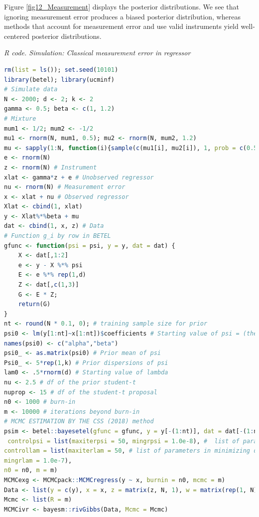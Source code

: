 Figure \ref{fig12_Measurement} displays the posterior distributions. We see that ignoring measurement error produces a biased posterior distribution, whereas methods that account for measurement error and use valid instruments yield well-centered posterior distributions.

\begin{tcolorbox}[enhanced,width=4.67in,center upper,
	fontupper=\large\bfseries,drop shadow southwest,sharp corners]
	\textit{R code. Simulation: Classical measurement error in regressor}
	\begin{VF}
		\begin{lstlisting}[language=R]	
rm(list = ls()); set.seed(10101)
library(betel); library(ucminf)
# Simulate data
N <- 2000; d <- 2; k <- 2
gamma <- 0.5; beta <- c(1, 1.2)
# Mixture
mum1 <- 1/2; mum2 <- -1/2
mu1 <- rnorm(N, mum1, 0.5); mu2 <- rnorm(N, mum2, 1.2)
mu <- sapply(1:N, function(i){sample(c(mu1[i], mu2[i]), 1, prob = c(0.5, 0.5))})
e <- rnorm(N)
z <- rnorm(N) # Instrument
xlat <- gamma*z + e # Unobserved regressor
nu <- rnorm(N) # Measurement error
x <- xlat + nu # Observed regressor
Xlat <- cbind(1, xlat)
y <- Xlat%*%beta + mu
dat <- cbind(1, x, z) # Data
# Function g_i by row in BETEL
gfunc <- function(psi = psi, y = y, dat = dat) {
	X <- dat[,1:2]
	e <- y - X %*% psi
	E <- e %*% rep(1,d)
	Z <- dat[,c(1,3)]
	G <- E * Z;
	return(G)
}
nt <- round(N * 0.1, 0); # training sample size for prior
psi0 <- lm(y[1:nt]~x[1:nt])$coefficients # Starting value of psi = (theta, v), v is the slack parameter in CSS (2018)
names(psi0) <- c("alpha","beta")
psi0_ <- as.matrix(psi0) # Prior mean of psi 
Psi0_ <- 5*rep(1,k) # Prior dispersions of psi
lam0 <- .5*rnorm(d) # Starting value of lambda
nu <- 2.5 # df of the prior student-t
nuprop <- 15 # df of the student-t proposal
n0 <- 1000 # burn-in
m <- 10000 # iterations beyond burn-in
# MCMC ESTIMATION BY THE CSS (2018) method
psim <- betel::bayesetel(gfunc = gfunc, y = y[-(1:nt)], dat = dat[-(1:nt),], psi0 = psi0, lam0 = lam0, psi0_ = psi0_, Psi0_ = Psi0_, nu = nu, nuprop = nuprop,
 controlpsi = list(maxiterpsi = 50, mingrpsi = 1.0e-8), #  list of parameters in maximizing likelihood over psi
controllam = list(maxiterlam = 50, # list of parameters in minimizing dual over lambda
mingrlam = 1.0e-7),
n0 = n0, m = m)
MCMCexg <- MCMCpack::MCMCregress(y ~ x, burnin = n0, mcmc = m)
Data <- list(y = c(y), x = x, z = matrix(z, N, 1), w = matrix(rep(1, N), N, 1))
Mcmc <- list(R = m)
MCMCivr <- bayesm::rivGibbs(Data, Mcmc = Mcmc)
\end{lstlisting}
	\end{VF}
\end{tcolorbox} 

